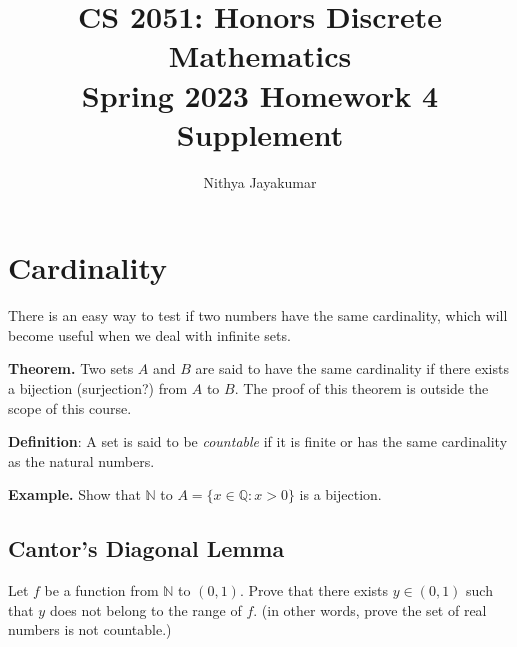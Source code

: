 \documentclass{article}
\title{\vspace{-1cm}CS 2051: Honors Discrete Mathematics \\Spring 2023 Homework 4 Supplement}
\author{Nithya Jayakumar }
\date{}
\begin{document}
\maketitle

\section*{Cardinality}
    
    There is an easy way to test if two numbers have the same cardinality, which will become useful when we deal with infinite sets.
    
    \vspace{1.5mm}
    \textbf{Theorem.} Two sets $A$ and $B$ are said to have the same cardinality if there exists a bijection (surjection?) from $A$ to $B$. The proof of this theorem is outside the scope of this course.
    
    \vspace{1.5mm}
    \textbf{Definition}: A set is said to be \textit{countable} if it is finite or has the same cardinality as the natural numbers.

    
    \textbf{Example.} 
    Show that $\mathbb{N}$ to $A = \{x \in \mathbb{Q}: x > 0\}$ is a bijection.
    
\subsection*{Cantor's Diagonal Lemma}
    Let $f$ be a function from $\mathbb{N}$ to $(0, 1)$. Prove that there exists $y \in (0, 1)$ such that $y$ does not belong to the range of $f$. (in other words, prove the set of real numbers is not countable.)
\end{document}
